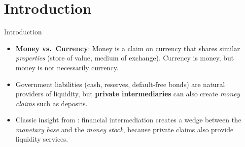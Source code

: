 \documentclass[11pt,aspectratio=169]{beamer}
\begin{document}
\section{Introduction}
\begin{frame}{Introduction}
\small
\begin{itemize}

  \item \textbf{Money vs.\ Currency}: Money is a claim on currency that shares similar \emph{properties} (store of value, medium of exchange).  
  Currency is money, but money is not necessarily currency.

  \vspace{0.6em}

  \item Government liabilities (cash, reserves, default-free bonds) are natural providers of liquidity, but \textbf{private intermediaries} can also create \emph{money claims} such as deposits.

  \vspace{0.6em}

  \item Classic insight from \textcite{Brunner1989HighPowered}:  
  financial intermediation creates a wedge between the \emph{monetary base} and the \emph{money stock}, because private claims also provide liquidity services.

\end{itemize}
\end{frame}
\end{document}
